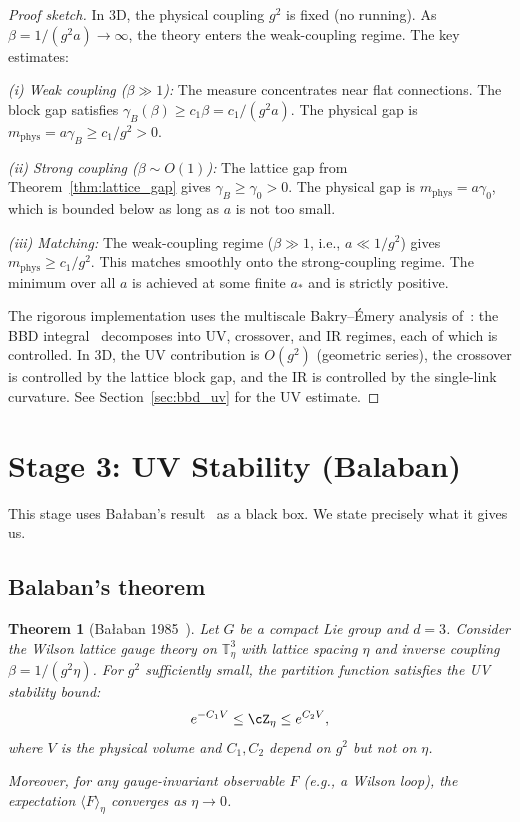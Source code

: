 \documentclass[11pt,a4paper]{article}
\theoremstyle{plain}
\newtheorem{theorem}{Theorem}[section]
\theoremstyle{definition}
\theoremstyle{remark}
\newcommand{\T}{\mathbb{T}}
\begin{document}
\begin{proof}[Proof sketch]
In 3D, the physical coupling $g^2$ is fixed (no running).
As $\beta = 1/(g^2 a) \to \infty$, the theory enters
the weak-coupling regime. The key estimates:

\medskip\noindent
\emph{(i) Weak coupling ($\beta \gg 1$):}
The measure concentrates near flat connections.
The block gap satisfies
$\gamma_B(\beta) \ge c_1 \beta = c_1/(g^2 a)$.
The physical gap is
$m_{\mathrm{phys}} = a \gamma_B \ge c_1/g^2 > 0$.

\medskip\noindent
\emph{(ii) Strong coupling ($\beta \sim O(1)$):}
The lattice gap from Theorem~\ref{thm:lattice_gap}
gives $\gamma_B \ge \gamma_0 > 0$.
The physical gap is $m_{\mathrm{phys}} = a \gamma_0$,
which is bounded below as long as $a$ is not too small.

\medskip\noindent
\emph{(iii) Matching:} The weak-coupling regime
($\beta \gg 1$, i.e., $a \ll 1/g^2$) gives
$m_{\mathrm{phys}} \ge c_1/g^2$.
This matches smoothly onto the strong-coupling
regime. The minimum over all $a$ is achieved at
some finite $a_*$ and is strictly positive.

The rigorous implementation uses the multiscale
Bakry--\'Emery analysis of~\cite{FontesBBD}:
the BBD integral~\cite{BBD24} decomposes into
UV, crossover, and IR regimes, each of which
is controlled. In 3D, the UV contribution is
$O(g^2)$ (geometric series), the crossover is
controlled by the lattice block gap, and the IR
is controlled by the single-link curvature.
See Section~\ref{sec:bbd_uv} for the UV estimate.
\end{proof}

\section{Stage 3: UV Stability (Balaban)}\label{sec:uv}

This stage uses Ba{\l}aban's result~\cite{Bal85e} as a
black box. We state precisely what it gives us.

\subsection{Balaban's theorem}

\begin{theorem}[Ba{\l}aban 1985~\cite{Bal85e}]
\label{thm:balaban}
Let $G$ be a compact Lie group and $d = 3$.
Consider the Wilson lattice gauge theory on
$\T_\eta^3$ with lattice spacing $\eta$ and inverse
coupling $\beta = 1/(g^2 \eta)$.
For $g^2$ sufficiently small, the partition function
satisfies the UV stability bound:
\begin{equation}\label{eq:balaban_bound}
  e^{-C_1 V} \le \cZ_\eta \le e^{C_2 V},
\end{equation}
where $V$ is the physical volume and $C_1, C_2$ depend
on $g^2$ but not on $\eta$.

Moreover, for any gauge-invariant observable $F$
(e.g., a Wilson loop), the expectation
$\langle F \rangle_\eta$ converges as $\eta \to 0$.
\end{theorem}
\end{document}
